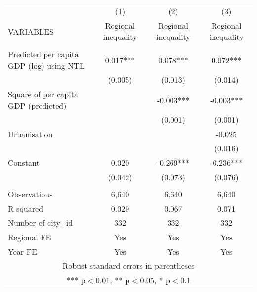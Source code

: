 \documentclass[]{article}
\begin{document}
\begin{tabular}{lccc} \hline
 & (1) & (2) & (3) \\
VARIABLES & Regional inequality & Regional inequality & Regional inequality \\ \hline
 &  &  &  \\
Predicted per capita GDP (log) using NTL & 0.017*** & 0.078*** & 0.072*** \\
 & (0.005) & (0.013) & (0.014) \\
Square of per capita GDP (predicted) &  & -0.003*** & -0.003*** \\
 &  & (0.001) & (0.001) \\
Urbanisation &  &  & -0.025 \\
 &  &  & (0.016) \\
Constant & 0.020 & -0.269*** & -0.236*** \\
 & (0.042) & (0.073) & (0.076) \\
 &  &  &  \\
Observations & 6,640 & 6,640 & 6,640 \\
R-squared & 0.029 & 0.067 & 0.071 \\
Number of city\_id & 332 & 332 & 332 \\
Regional FE & Yes & Yes & Yes \\
 Year FE & Yes & Yes & Yes \\ \hline
\multicolumn{4}{c}{ Robust standard errors in parentheses} \\
\multicolumn{4}{c}{ *** p$<$0.01, ** p$<$0.05, * p$<$0.1} \\
\end{tabular}
\end{document}
